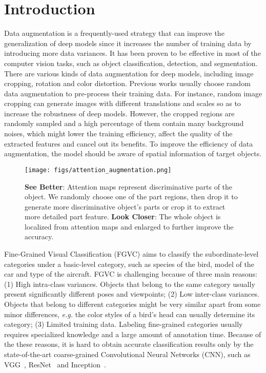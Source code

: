 \documentclass[10pt,twocolumn,letterpaper]{article}
\def\eg{{\em e.g. }}
\begin{document}
\section{Introduction}
\label{sec:introduction}
Data augmentation is a frequently-used strategy that can improve the generalization of deep models since it increases the number of training data by introducing more data variances. It has been proven to be effective in most of the computer vision tasks, such as object classification, detection, and segmentation. There are various kinds of data augmentation for deep models, including image cropping, rotation and color distortion. Previous works usually choose random data augmentation to pre-process their training data. For instance, random image cropping can generate images with different translations and scales so as to increase the robustness of deep models. However, the cropped regions are randomly sampled and a high percentage of them contain many background noises, which might lower the training efficiency, affect the quality of the extracted features and cancel out its benefits. To improve the efficiency of data augmentation, the model should be aware of spatial information of target objects.

\begin{figure}[t]
    \begin{center}
        \texttt{[image: figs/attention\_augmentation.png]}
    \end{center}
    \caption{\small \textbf{See Better}: Attention maps represent discriminative parts of the object. We randomly choose one of the part regions, then drop it to generate more discriminative object's parts or crop it to extract more detailed part feature. \textbf{Look Closer}: The whole object is localized from attention maps and enlarged to further improve the accuracy.}
    \label{fig:attention_augmentation}
\end{figure}

Fine-Grained Visual Classification (FGVC) aims to classify the subordinate-level categories under a basic-level category, such as species of the bird,  model of the car and type of the aircraft. FGVC is challenging because of three main reasons: (1) High intra-class variances. Objects that belong to the same category usually present significantly different poses and viewpoints; (2) Low inter-class variances. Objects that belong to different categories might be very similar apart from some minor differences, \eg the color styles of a bird's head can usually determine its category; (3) Limited training data. Labeling fine-grained categories usually requires specialized knowledge and a large amount of annotation time. Because of the these reasons, it is hard to obtain accurate classification results only by the state-of-the-art coarse-grained Convolutional Neural Networks (CNN), such as VGG~\cite{vgg}, ResNet~\cite{resnet} and Inception~\cite{inception}.
\end{document}
